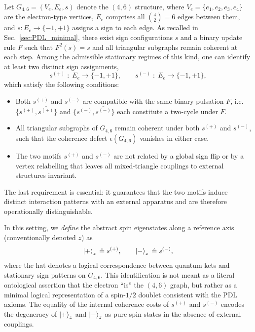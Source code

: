 \documentclass[11pt,a4paper]{article}
\numberwithin{equation}{section}
\begin{document}
Let $G_{4,6}=(V_{e},E_{e},s)$ denote the $(4,6)$ structure, where $V_{e}=\{e_1,e_2,e_3,e_4\}$ are the electron-type vertices, $E_{e}$ comprises all $\binom{4}{2}=6$ edges between them, and $s:E_{e}\to\{-1,+1\}$ assigns a sign to each edge. As recalled in Sec.~\ref{sec:PDL_minimal}, there exist sign configurations $s$ and a binary update rule $F$ such that $F^2(s)=s$ and all triangular subgraphs remain coherent at each step. Among the admissible stationary regimes of this kind, one can identify at least two distinct sign assignments,
\begin{equation}
  s^{(+)} \;:\; E_{e}\to\{-1,+1\},
  \qquad
  s^{(-)} \;:\; E_{e}\to\{-1,+1\},
\end{equation}
which satisfy the following conditions:
\begin{itemize}
  \item[(i)] Both $s^{(+)}$ and $s^{(-)}$ are compatible with the same binary pulsation $F$, i.e.\ $\{s^{(+)},\overline{s^{(+)}}\}$ and $\{s^{(-)},\overline{s^{(-)}}\}$ each constitute a two-cycle under $F$.
  \item[(ii)] All triangular subgraphs of $G_{4,6}$ remain coherent under both $s^{(+)}$ and $s^{(-)}$, such that the coherence defect $\epsilon(G_{4,6})$ vanishes in either case.
  \item[(iii)] The two motifs $s^{(+)}$ and $s^{(-)}$ are not related by a global sign flip or by a vertex relabelling that leaves all mixed-triangle couplings to external structures invariant.
\end{itemize}
The last requirement is essential: it guarantees that the two motifs induce distinct interaction patterns with an external apparatus and are therefore operationally distinguishable.

In this setting, we \emph{define} the abstract spin eigenstates along a reference axis (conventionally denoted $z$) as
\begin{equation}
  \ket{+}_z \;\hat{=}\; s^{(+)},
  \qquad
  \ket{-}_z \;\hat{=}\; s^{(-)},
\end{equation}
where the hat denotes a logical correspondence between quantum kets and stationary sign patterns on $G_{4,6}$. This identification is not meant as a literal ontological assertion that the electron ``is'' the $(4,6)$ graph, but rather as a minimal logical representation of a spin-$1/2$ doublet consistent with the PDL axioms. The equality of the internal coherence costs of $s^{(+)}$ and $s^{(-)}$ encodes the degeneracy of $\ket{+}_z$ and $\ket{-}_z$ as pure spin states in the absence of external couplings.
\end{document}
